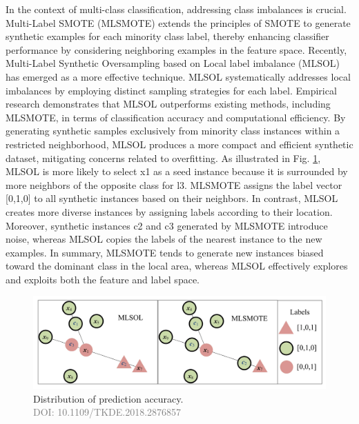 In the context of multi-class classification, addressing class imbalances is crucial. Multi-Label SMOTE (MLSMOTE) extends the principles of SMOTE to generate synthetic examples for each minority class label, thereby enhancing classifier performance by considering neighboring examples in the feature space. Recently, Multi-Label Synthetic Oversampling based on Local label imbalance (MLSOL) has emerged as a more effective technique. MLSOL systematically addresses local imbalances by employing distinct sampling strategies for each label. Empirical research demonstrates that MLSOL outperforms existing methods, including MLSMOTE, in terms of classification accuracy and computational efficiency. By generating synthetic samples exclusively from minority class instances within a restricted neighborhood, MLSOL produces a more compact and efficient synthetic dataset, mitigating concerns related to overfitting.
As illustrated in Fig. \ref{fig:mlsmote_mlsol}, MLSOL is more likely to select x1 as a seed instance because it is surrounded by more neighbors of the opposite class for l3. MLSMOTE assigns the label vector [0,1,0] to all synthetic instances based on their neighbors. In contrast, MLSOL creates more diverse instances by assigning labels according to their location. Moreover, synthetic instances c2 and c3 generated by MLSMOTE introduce noise, whereas MLSOL copies the labels of the nearest instance to the new examples. In summary, MLSMOTE tends to generate new instances biased toward the dominant class in the local area, whereas MLSOL effectively explores and exploits both the feature and label space.
\begin{figure}[!ht]

    \begin{center}
      \includegraphics[width=1\textwidth]{3_State-of-the-art/fig/mlsmote_mlsol.png}
    \end{center}

    \caption{Distribution of prediction accuracy. \\ \textcolor{gray}{\fontsize{10}{0}\selectfont DOI: 10.1109/TKDE.2018.2876857}}
    \label{fig:mlsmote_mlsol}

    \end{figure}
    
